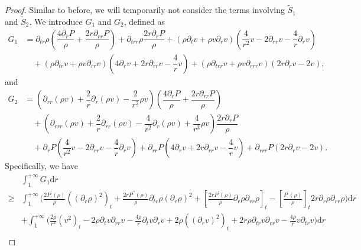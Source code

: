 \documentclass[10pt,reqno]{amsart}
\numberwithin{equation}{section}
\begin{document}
\begin{proof}
		Similar to before, we will temporarily not consider the terms involving $\tilde{S}_1$ and $\tilde{S}_2$. 
		We introduce $G_1$ and $G_2$, defined as
		\begin{equation}\nonumber
			\begin{aligned}
				G_1
				&=\partial_{tr} \rho(\dfrac{4\partial_{r}{P}}{\rho}+\dfrac{2r\partial_{rr}{P}}{\rho})
				+\partial_{trr} \rho\dfrac{2r\partial_{r}{P}}{\rho}+(\rho\partial_{t} v+\rho v \partial_{r} v)(\dfrac{4}{r^2}v-2\partial_{rr}v-\dfrac{4}{r}\partial_{r}v)\\
				&\quad+(\rho\partial_{tr} v+\rho v \partial_{rr} v)(4\partial_{r}v+2r\partial_{rr}v-\dfrac{4}{r}v)
				+(\rho\partial_{trr} v+\rho v \partial_{rrr} v)(2r\partial_{r}v-2v),
			\end{aligned}
		\end{equation}
		and
		\begin{equation}\nonumber
			\begin{aligned}
				G_2&=
				(\partial_{rr}(\rho v)+\dfrac{2}{r} \partial_r(\rho v)-\dfrac{2}{r^2} \rho v) (\dfrac{4\partial_{r}{P}}{\rho}+\dfrac{2r\partial_{rr}{P}}{\rho})\\
				&\quad+(\partial_{rrr}(\rho v)+\dfrac{2}{r} \partial_{rr}(\rho v)-\dfrac{4}{r^2} \partial_{r}(\rho v)+\dfrac{4}{r^3}\rho v) \dfrac{2r\partial_{r}{P}}{\rho}\\
				&\quad+\partial_{r} P (\dfrac{4}{r^2}v-2\partial_{rr}v-\dfrac{4}{r}\partial_{r}v)
				+\partial_{rr} P (4\partial_{r}v+2r\partial_{rr}v-\dfrac{4}{r}v)
				+\partial_{rrr} P(2r\partial_{r}v-2v).
			\end{aligned}
		\end{equation}
		Specifically, we have
			\begin{align*}
				&\int_{1}^{+\infty}G_1\mathrm{d}r\\
				\geq&\int_{1}^{+\infty}\bigg(\frac{2 P^{\prime}(\rho)}{\rho}((\partial_{r}\rho)^2)_t
				+\frac{2r P^{\prime\prime}(\rho)}{\rho}\partial_{tr}\rho(\partial_{r}\rho)^2
				+\left[\frac{2rP^{\prime}(\rho)}{\rho}\partial_{r}\rho\partial_{rr}\rho\right]_t 
				-\left[\frac{P^{\prime}(\rho)}{\rho}\right]_t2r\partial_{r}\rho\partial_{rr}\rho\bigg)\mathrm{d}r\\
				&+\int_{1}^{+\infty}\bigg(
				\frac{2\rho}{r^2}(v^2)_t -2\rho\partial_{t} v\partial_{rr} v-\frac{4\rho}{r}\partial_{t} v\partial_{r} v
				+2\rho((\partial_{r}v)^2)_t+2r\rho\partial_{tr} v\partial_{rr} v-\frac{4\rho}{r}v\partial_{tr} v\bigg)\mathrm{d}r\\

\end{align*}
\end{proof}
\end{document}
